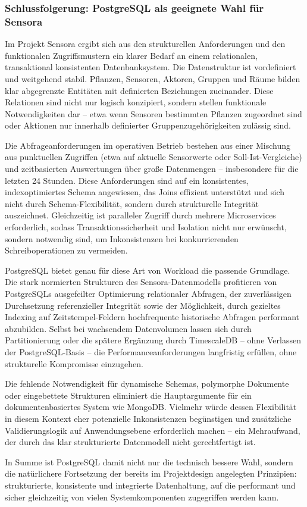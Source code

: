 \subsubsection{Schlussfolgerung: PostgreSQL als geeignete Wahl für Sensora}
Im Projekt Sensora ergibt sich aus den strukturellen Anforderungen und den funktionalen Zugriffsmustern ein klarer Bedarf an einem relationalen, transaktional konsistenten Datenbanksystem. Die Datenstruktur ist vordefiniert und weitgehend stabil. Pflanzen, Sensoren, Aktoren, Gruppen und Räume bilden klar abgegrenzte Entitäten mit definierten Beziehungen zueinander. Diese Relationen sind nicht nur logisch konzipiert, sondern stellen funktionale Notwendigkeiten dar – etwa wenn Sensoren bestimmten Pflanzen zugeordnet sind oder Aktionen nur innerhalb definierter Gruppenzugehörigkeiten zulässig sind.

Die Abfrageanforderungen im operativen Betrieb bestehen aus einer Mischung aus punktuellen Zugriffen (etwa auf aktuelle Sensorwerte oder Soll-Ist-Vergleiche) und zeitbasierten Auswertungen über große Datenmengen – insbesondere für die letzten 24 Stunden. Diese Anforderungen sind auf ein konsistentes, indexoptimiertes Schema angewiesen, das Joins effizient unterstützt und sich nicht durch Schema-Flexibilität, sondern durch strukturelle Integrität auszeichnet. Gleichzeitig ist paralleler Zugriff durch mehrere Microservices erforderlich, sodass Transaktionssicherheit und Isolation nicht nur erwünscht, sondern notwendig sind, um Inkonsistenzen bei konkurrierenden Schreiboperationen zu vermeiden.

PostgreSQL bietet genau für diese Art von Workload die passende Grundlage. Die stark normierten Strukturen des Sensora-Datenmodells profitieren von PostgreSQLs ausgefeilter Optimierung relationaler Abfragen, der zuverlässigen Durchsetzung referenzieller Integrität sowie der Möglichkeit, durch gezieltes Indexing auf Zeitstempel-Feldern hochfrequente historische Abfragen performant abzubilden. Selbst bei wachsendem Datenvolumen lassen sich durch Partitionierung oder die spätere Ergänzung durch TimescaleDB – ohne Verlassen der PostgreSQL-Basis – die Performanceanforderungen langfristig erfüllen, ohne strukturelle Kompromisse einzugehen.

Die fehlende Notwendigkeit für dynamische Schemas, polymorphe Dokumente oder eingebettete Strukturen eliminiert die Hauptargumente für ein dokumentenbasiertes System wie MongoDB. Vielmehr würde dessen Flexibilität in diesem Kontext eher potenzielle Inkonsistenzen begünstigen und zusätzliche Validierungslogik auf Anwendungsebene erforderlich machen – ein Mehraufwand, der durch das klar strukturierte Datenmodell nicht gerechtfertigt ist.

In Summe ist PostgreSQL damit nicht nur die technisch bessere Wahl, sondern die natürlichere Fortsetzung der bereits im Projektdesign angelegten Prinzipien: strukturierte, konsistente und integrierte Datenhaltung, auf die performant und sicher gleichzeitig von vielen Systemkomponenten zugegriffen werden kann.
